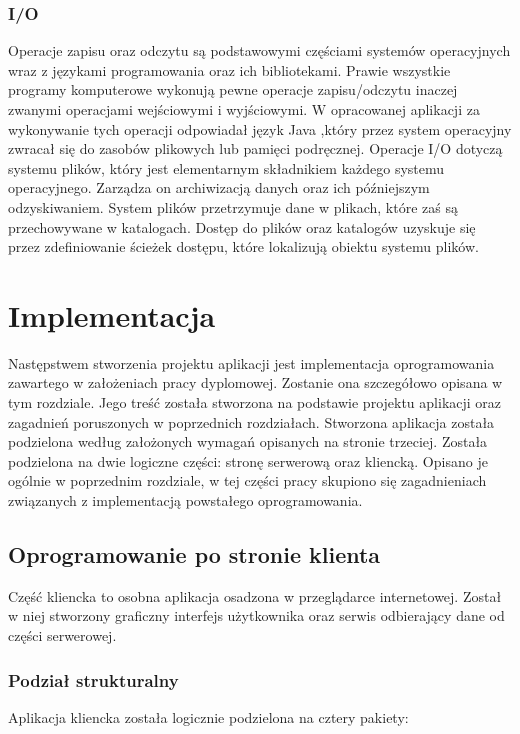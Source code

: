 \documentclass[12pt, twoside]{report}
\begin{document}
\subsection{I/O}
Operacje zapisu oraz odczytu są podstawowymi częściami systemów operacyjnych wraz z językami programowania oraz ich bibliotekami. Prawie wszystkie programy komputerowe wykonują pewne operacje zapisu/odczytu inaczej zwanymi operacjami wejściowymi i wyjściowymi. W opracowanej aplikacji za wykonywanie tych operacji odpowiadał język Java ,który przez system operacyjny zwracał się do zasobów plikowych lub pamięci podręcznej. Operacje I/O dotyczą systemu plików, który jest elementarnym składnikiem każdego systemu operacyjnego. Zarządza on archiwizacją danych oraz ich późniejszym odzyskiwaniem. System plików przetrzymuje dane w plikach, które zaś są przechowywane w katalogach. Dostęp do plików oraz katalogów uzyskuje się przez zdefiniowanie ścieżek dostępu, które lokalizują obiektu systemu plików.\cite{i/o}

\newpage
\chapter{Implementacja}
Następstwem stworzenia projektu aplikacji jest implementacja oprogramowania zawartego w założeniach pracy dyplomowej. Zostanie ona szczegółowo opisana w tym rozdziale. Jego treść została stworzona na podstawie projektu aplikacji oraz zagadnień poruszonych w poprzednich rozdziałach. Stworzona aplikacja została podzielona według założonych wymagań opisanych na stronie trzeciej. Została podzielona na dwie logiczne części: stronę serwerową oraz kliencką. Opisano je ogólnie w poprzednim rozdziale, w tej części pracy skupiono się zagadnieniach związanych z implementacją powstałego oprogramowania.

\section{Oprogramowanie po stronie klienta}
Część kliencka to osobna aplikacja osadzona w przeglądarce internetowej. Został w niej stworzony graficzny interfejs użytkownika oraz serwis odbierający dane od części serwerowej.
\subsection{Podział strukturalny}
Aplikacja kliencka została logicznie podzielona na cztery pakiety: 
\end{document}

